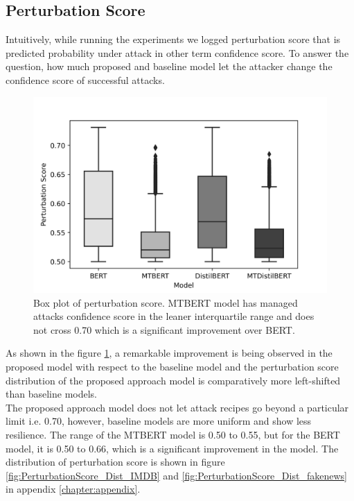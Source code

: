 \documentclass[%
	BCOR=8mm, %
	DIV=12,
	toc=bibliography, %
	toc=listof, %
	oneside, %
	egregdoesnotlikesansseriftitles, %
	]{scrbook}
\begin{document}
\subsection{Perturbation Score}
Intuitively, while running the experiments we logged perturbation score that is predicted probability under attack in other term confidence score. To answer the question, how much proposed and baseline model let the attacker change the confidence score of successful attacks. 
\begin{figure}[H]
    \centering
    \includegraphics[width=.70\linewidth]{img/PertScoreDist}
    \caption[Box plot of perturbation score]{\small Box plot of perturbation score. MTBERT model has managed attacks confidence score in the leaner interquartile range and does not cross 0.70 which is a significant improvement over BERT.}
    \label{fig:pertscoredist}
\end{figure}
As shown in the figure \ref{fig:pertscoredist}, a remarkable improvement is being observed in the proposed model  with respect to the baseline model and the perturbation score distribution of the proposed approach model is comparatively more left-shifted than baseline models. \\
The proposed approach model does not let attack recipes go beyond a particular limit i.e. 0.70, however, baseline models are more uniform and show less resilience.  The range of the MTBERT model is 0.50 to 0.55, but for the BERT model, it is 0.50 to 0.66, which is a significant improvement in the model.
The distribution of perturbation score is shown in figure \ref{fig:PerturbationScore_Dist_IMDB} and \ref{fig:PerturbationScore_Dist_fakenews} in appendix \ref{chapter:appendix}.
\end{document}
